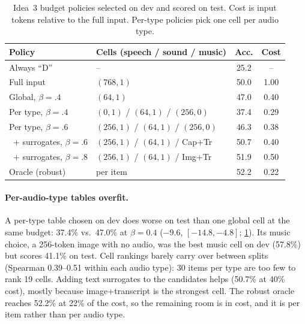 \documentclass{article}
\begin{document}
\begin{table}[t]
\caption{Idea~3 budget policies selected on dev and scored on test. Cost is input
tokens relative to the full input. Per-type policies pick one cell per audio type.}
\label{tab:idea3-policies}
\centering\small
\setlength{\tabcolsep}{3pt}
\begin{tabular}{llcc}
\toprule
Policy & Cells (speech / sound / music) & Acc. & Cost \\
\midrule
Always ``D''         & --                                 & 25.2 & -- \\
Full input           & $(768,1)$                          & 50.0 & 1.00 \\
Global, $\beta{=}.4$ & $(64,1)$                           & 47.0 & 0.40 \\
Per type, $\beta{=}.4$ & $(0,1)$ / $(64,1)$ / $(256,0)$    & 37.4 & 0.29 \\
Per type, $\beta{=}.6$ & $(256,1)$ / $(64,1)$ / $(256,0)$  & 46.3 & 0.38 \\
\, + surrogates, $\beta{=}.6$ & $(256,1)$ / $(64,1)$ / Cap+Tr & 50.7 & 0.40 \\
\, + surrogates, $\beta{=}.8$ & $(256,1)$ / $(64,1)$ / Img+Tr & 51.9 & 0.50 \\
Oracle (robust)      & per item                           & 52.2 & 0.22 \\
\bottomrule
\end{tabular}
\end{table}

\paragraph{Per-audio-type tables overfit.} A per-type table chosen on dev does worse
on test than one global cell at the same budget: 37.4\% vs.\ 47.0\% at $\beta=0.4$
($-9.6$, $[-14.8,-4.8]$; \cref{tab:idea3-policies}). Its music choice, a 256-token
image with no audio, was the best music cell on dev (57.8\%) but scores 41.1\% on
test. Cell rankings barely carry over between splits (Spearman 0.39--0.51 within each
audio type): 30 items per type are too few to rank 19 cells. Adding text surrogates
to the candidates helps (50.7\% at 40\% cost), mostly because image+transcript is the
strongest cell. The robust oracle reaches 52.2\% at 22\% of the cost, so the
remaining room is in cost, and it is per item rather than per audio type.
\end{document}
